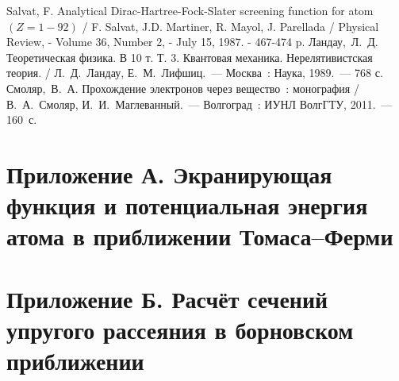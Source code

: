 \clearpage
\renewcommand{\refname}{СПИСОК ИСПОЛЬЗОВАННЫХ ИСТОЧНИКОВ}
\begin{thebibliography}{10}
 Salvat, F. Analytical Dirac-Hartree-Fock-Slater screening
function for atom $(Z=1-92)$ / F. Salvat, J.D. Martiner, R. Mayol, J.
Parellada / Physical Review, - Volume 36, Number 2, - July 15, 1987. -
467-474 p.
 Ландау,~Л.~Д. Теоретическая физика. В 10 т. Т. 3. Квантовая механика. Нерелятивистская теория. / Л.~Д.~Ландау, Е.~М.~Лифшиц.~--- Москва~: Наука, 1989.~--- 768 с.
 Смоляр,~В.~А. Прохождение электронов через вещество~: монография / В.~А.~Смоляр, И.~И.~Маглеванный.~--- Волгоград~: ИУНЛ ВолгГТУ, 2011.~--- 160~с.

\end{thebibliography}
\newpage
{}
\section*{Приложение А. Экранирующая функция и потенциальная энергия атома в
приближении Томаса--Ферми}


  \vspace{1.5em}
  
\newpage
{}
\section*{Приложение Б. Расчёт сечений упругого рассеяния в борновском
    приближении}
  \label{sec:code}
  

